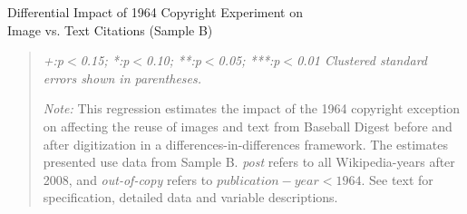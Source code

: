 \newpage
\begin{center}
\begin{table}[!htbp]
\caption{Differential Impact of 1964 Copyright Experiment on \\ Image vs. Text Citations (Sample B)}
\vspace{5mm}


\begin{quote}
\vspace{5mm}

\emph{+:p$<$0.15; *:p$<$0.10; **:p$<$0.05; ***:p$<$0.01 
\newline
Clustered standard errors shown in parentheses.}

\vspace{5mm}

\emph{Note:} This regression estimates the impact of the 1964 copyright exception on affecting the reuse of images and text from Baseball Digest before and after digitization in a differences-in-differences framework. The estimates presented use data from Sample B. \emph{post} refers to all Wikipedia-years after 2008, and \emph{out-of-copy} refers to $publication-year < 1964$. See text for specification, detailed data and variable descriptions.
\end{quote}
\label{tab:imgdd_sampleb}
\end{table}
\end{center}

\clearpage


